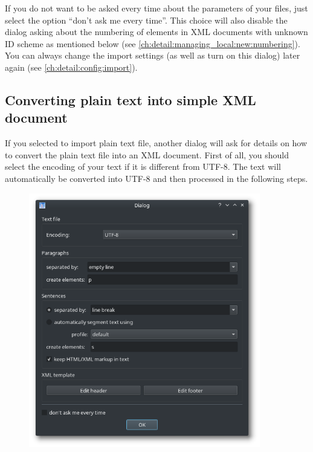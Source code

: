 \documentclass[a4paper,10pt,oneside]{book}
\begin{document}
If you do not want to be asked every time about the parameters of your files, just select the option ``don't ask me every time''. This choice will also disable the dialog asking about the numbering of elements in XML documents with unknown ID scheme as mentioned below (see \ref{ch:detail:managing_local:new:numbering}). You can always change the import settings (as well as turn on this dialog) later again (see \ref{ch:detail:config:import}).




\subsection{Converting plain text into simple XML document}\label{ch:detail:managing_local:new:txt2xml}

If you selected to import plain text file, another dialog will ask for details on how to convert the plain text file into an XML document. First of all, you should select the encoding of your text if it is different from UTF-8. The text will automatically be converted into UTF-8 and then processed in the following steps.

\begin{figure}[htb!]
 \includegraphics[width=0.9\textwidth]{screenshots/text_import.png}
\end{figure}
\end{document}

